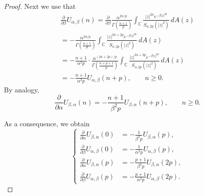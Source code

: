 \documentclass[12pt]{amsart}
\numberwithin{equation}{section}
\theoremstyle{plain}
\numberwithin{equation}{section}
\begin{document}
\begin{proof}
Next we use that 
\begin{multline}
\frac{\partial}{\partial \beta}U_{\alpha,\beta}(n)=\frac{\partial}{\partial \beta}\frac{ \alpha^{2n/p}}{\Gamma(\frac{n+1}{p})} \int_{\mathbb C}  \frac{  |z|^{2n} e^{-  \beta |z|^{2p}}  }{ S_{\alpha,2p}(|z|^2)}\,dA(z)\\=
-\frac{ \alpha^{2n/p}}{\Gamma(\frac{n+1}{p})} \int_{\mathbb C}  \frac{  |z|^{2n+2p} e^{-  \beta |z|^{2p}}  }{ S_{\alpha,2p}(|z|^2)}\,dA(z)\\=-\frac{n+1}{\alpha^2p}\cdot\frac{ \alpha^{(2n+2p)/p}}{\Gamma(\frac{n+p+1}{p})} \int_{\mathbb C}  \frac{  |z|^{2n+2p} e^{-  \beta |z|^{2p}}  }{ S_{\alpha,2p}(|z|^2)}\,dA(z)\\=-\frac{n+1}{\alpha^2p}U_{\alpha,\beta}(n+p),\qquad n\ge 0.
\label{tt6}
\end{multline}
By analogy,
\begin{equation}
\frac{\partial}{\partial \alpha}U_{\beta,\alpha}(n)=-\frac{n+1}{\beta^2p}U_{\beta,\alpha}(n+p),\qquad n\ge 0.
\label{tt7}
\end{equation}

As a consequence, we obtain 
\begin{equation}
\left\{
\begin{aligned}
\frac{\partial}{\partial \alpha}U_{\beta,\alpha}(0)&=-\frac{1}{\beta^2p}U_{\beta,\alpha}(p),\\
\frac{\partial}{\partial \beta}U_{\alpha,\beta}(0)&=-\frac{1}{\alpha^2p}U_{\alpha,\beta}(p),\\
\frac{\partial}{\partial \alpha}U_{\beta,\alpha}(p)&=-\frac{p+1}{\beta^2p}U_{\beta,\alpha}(2p),\\ 
\frac{\partial}{\partial \beta}U_{\alpha,\beta}(p)&=-\frac{p+1}{\alpha^2p}U_{\alpha,\beta}(2p).
\end{aligned}
\right.
\label{start}
\end{equation}


\end{proof}
\end{document}

